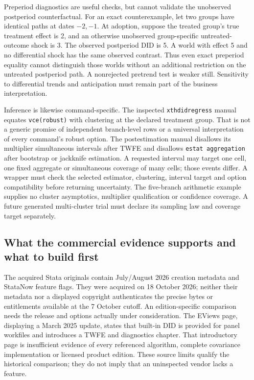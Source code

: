 Preperiod diagnostics are useful checks, but cannot validate the unobserved
postperiod counterfactual. For an exact counterexample, let two groups have
identical paths at dates \(-2,-1\). At adoption, suppose the treated group's
true treatment effect is 2, and an otherwise unobserved group-specific
untreated-outcome shock is 3. The observed postperiod DID is 5. A world
with effect 5 and no differential shock has the same observed contrast.
Thus even exact preperiod equality cannot distinguish those worlds without
an additional restriction on the untreated postperiod path. A nonrejected
pretrend test is weaker still. Sensitivity to differential trends and
anticipation must remain part of the business interpretation.
\citep{exec18_gp_panel_reference}

Inference is likewise command-specific. The inspected \texttt{xthdidregress}
manual equates \texttt{vce(robust)} with clustering at the declared treatment
group. That is not a generic promise of independent branch-level rows or
a universal interpretation of every command's robust option. The
postestimation manual disallows its multiplier simultaneous intervals after
TWFE and disallows \texttt{estat aggregation} after bootstrap or jackknife
estimation. A requested interval may target one cell, one fixed aggregate
or simultaneous coverage of many cells; those events differ. A wrapper
must check the selected estimator, clustering, interval target and option
compatibility before returning uncertainty. The five-branch arithmetic
example supplies no cluster asymptotics, multiplier qualification or
confidence coverage. A future generated multi-cluster trial must declare
its sampling law and coverage target separately.
\citep{exec18_gp_stata_xthdid,exec18_gp_stata_post,exec18_gp_panel_reference}

\subsection{What the commercial evidence supports and what to build first}

The acquired Stata originals contain July/August 2026 creation metadata and
StataNow feature flags. They were acquired on 18 October 2026; neither their
metadata nor a displayed copyright authenticates the precise bytes or
entitlements available at the 7 October cutoff. An edition-specific
comparison needs the release and options actually under consideration.
The EViews page, displaying a March 2025 update, states that built-in DID is
provided for panel workfiles and introduces a TWFE and diagnostics chapter.
That introductory page is insufficient evidence of every referenced
algorithm, complete covariance implementation or licensed product edition.
These source limits qualify the historical comparison; they do not imply
that an uninspected vendor lacks a feature.
\citep{exec18_gp_stata_did,exec18_gp_stata_hdid,exec18_gp_stata_xthdid,exec18_gp_stata_post,exec18_gp_eviews}


